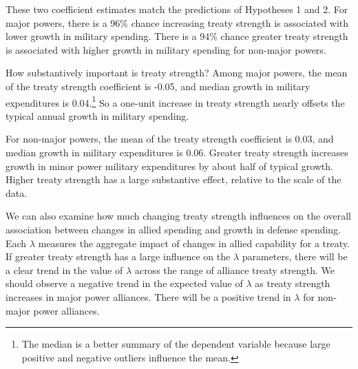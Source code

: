 \documentclass[12pt]{article}
\begin{document}
These two coefficient estimates match the predictions of Hypotheses 1 and 2. 
For major powers, there is a 96\% chance increasing treaty strength is associated with lower growth in military spending. 
There is a 94\% chance greater treaty strength is associated with higher growth in military spending for non-major powers.


How substantively important is treaty strength? 
Among major powers, the mean of the treaty strength coefficient is -0.05, and median growth in military expenditures is 0.04.\footnote{The median is a better summary of the dependent variable because large positive and negative outliers influence the mean.} 
So a one-unit increase in treaty strength nearly offsets the typical annual growth in military spending. 


For non-major powers, the mean of the treaty strength coefficient is 0.03, and median growth in military expenditures is 0.06. 
Greater treaty strength increases growth in minor power military expenditures by about half of typical growth. 
Higher treaty strength has a large substantive effect, relative to the scale of the data. 


We can also examine how much changing treaty strength influences on the overall association between changes in allied spending and growth in defense spending. 
Each $\lambda$ measures the aggregate impact of changes in allied capability for a treaty. 
If greater treaty strength has a large influence on the $\lambda$ parameters, there will be a clear trend in the value of $\lambda$ across the range of alliance treaty strength.
We should observe a negative trend in the expected value of $\lambda$ as treaty strength increases in major power alliances. 
There will be a positive trend in $\lambda$ for non-major power alliances. 
\end{document}
